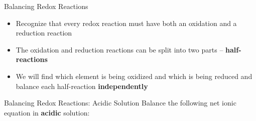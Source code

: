 \documentclass[handout]{beamer}
\begin{document}
\begin{frame}{Balancing Redox Reactions}
	\begin{itemize}
		\item Recognize that every redox reaction must have both an
			oxidation and a reduction reaction
		\item The oxidation and reduction reactions can be split into
			two parts -- \textbf{half-reactions}
		\item We will find which element is being oxidized and which is
			being reduced and balance each half-reaction
			\textbf{independently}
	\end{itemize}
\end{frame}

\begin{frame}{Balancing Redox Reactions: Acidic Solution}
	Balance the following net ionic equation in \textbf{acidic} solution:

	\begin{center}
	\end{center}


\end{frame}
\end{document}
